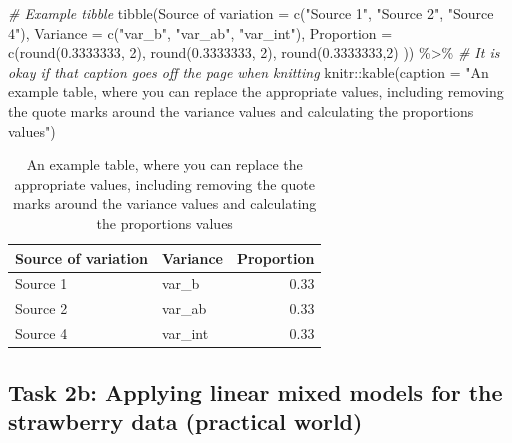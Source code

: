 \documentclass[
  openany]{book}
\newenvironment{Shaded}{\begin{snugshade}}{\end{snugshade}}
\newcommand{\AttributeTok}[1]{\textcolor[rgb]{0.77,0.63,0.00}{#1}}
\newcommand{\CommentTok}[1]{\textcolor[rgb]{0.56,0.35,0.01}{\textit{#1}}}
\newcommand{\DecValTok}[1]{\textcolor[rgb]{0.00,0.00,0.81}{#1}}
\newcommand{\FloatTok}[1]{\textcolor[rgb]{0.00,0.00,0.81}{#1}}
\newcommand{\FunctionTok}[1]{\textcolor[rgb]{0.00,0.00,0.00}{#1}}
\newcommand{\NormalTok}[1]{#1}
\newcommand{\OtherTok}[1]{\textcolor[rgb]{0.56,0.35,0.01}{#1}}
\newcommand{\SpecialCharTok}[1]{\textcolor[rgb]{0.00,0.00,0.00}{#1}}
\newcommand{\StringTok}[1]{\textcolor[rgb]{0.31,0.60,0.02}{#1}}
\begin{document}
\begin{Shaded}
\begin{Highlighting}[]
\CommentTok{\# Example tibble}
\FunctionTok{tibble}\NormalTok{(}\StringTok{\textasciigrave{}}\AttributeTok{Source of variation}\StringTok{\textasciigrave{}} \OtherTok{=} \FunctionTok{c}\NormalTok{(}\StringTok{"Source 1"}\NormalTok{, }
                                 \StringTok{"Source 2"}\NormalTok{, }
                                 \StringTok{"Source 4"}\NormalTok{),}
       \AttributeTok{Variance =} \FunctionTok{c}\NormalTok{(}\StringTok{"var\_b"}\NormalTok{, }\StringTok{"var\_ab"}\NormalTok{, }\StringTok{"var\_int"}\NormalTok{),}
       \AttributeTok{Proportion =} \FunctionTok{c}\NormalTok{(}\FunctionTok{round}\NormalTok{(}\FloatTok{0.3333333}\NormalTok{, }\DecValTok{2}\NormalTok{),}
                      \FunctionTok{round}\NormalTok{(}\FloatTok{0.3333333}\NormalTok{, }\DecValTok{2}\NormalTok{),}
                      \FunctionTok{round}\NormalTok{(}\FloatTok{0.3333333}\NormalTok{,}\DecValTok{2}\NormalTok{) )) }\SpecialCharTok{\%\textgreater{}\%} 
  \CommentTok{\# It is okay if that caption goes off the page when knitting}
\NormalTok{  knitr}\SpecialCharTok{::}\FunctionTok{kable}\NormalTok{(}\AttributeTok{caption =} \StringTok{"An example table, where you can replace the appropriate values, including removing the quote marks around the variance values and calculating the proportions values"}\NormalTok{)}
\end{Highlighting}
\end{Shaded}

\begin{table}

\caption{\label{tab:unnamed-chunk-15}An example table, where you can replace the appropriate values, including removing the quote marks around the variance values and calculating the proportions values}
\centering
\begin{tabular}[t]{l|l|r}
\hline
Source of variation & Variance & Proportion\\
\hline
Source 1 & var\_b & 0.33\\
\hline
Source 2 & var\_ab & 0.33\\
\hline
Source 4 & var\_int & 0.33\\
\hline
\end{tabular}
\end{table}

\hypertarget{task-2b-applying-linear-mixed-models-for-the-strawberry-data-practical-world}{%
\subsection{Task 2b: Applying linear mixed models for the strawberry data (practical world)}\label{task-2b-applying-linear-mixed-models-for-the-strawberry-data-practical-world}}
\end{document}
